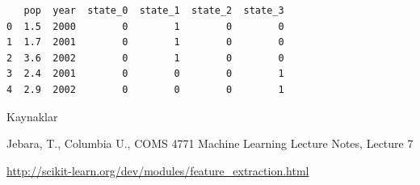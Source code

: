 \documentclass[12pt,fleqn]{article}\usepackage{../common}
\begin{document}
\begin{verbatim}
   pop  year  state_0  state_1  state_2  state_3
0  1.5  2000        0        1        0        0
1  1.7  2001        0        1        0        0
2  3.6  2002        0        1        0        0
3  2.4  2001        0        0        0        1
4  2.9  2002        0        0        0        1
\end{verbatim}

Kaynaklar

Jebara, T., Columbia U., COMS 4771 Machine Learning Lecture Notes, Lecture 7

\url{http://scikit-learn.org/dev/modules/feature_extraction.html}
\end{document}
